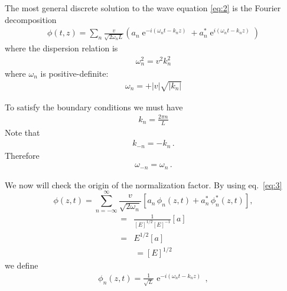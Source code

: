 \begin{frame}
The most general discrete solution to the wave equation  \eqref{eq:2} is the Fourier decomposition
\begin{align}
  \label{eq:3}
  \phi(t,z)=\sum_{n}\frac{v}{\sqrt{2\omega_{n} L}}
  \left(a_{n} \operatorname{e}^{-i (\omega_n t-k_nz) }+a_{n}^* \operatorname{e}^{i (\omega_n t-k_n z) }\right)
\end{align}
where the dispersion relation is
\begin{align}
\label{eq:4}
  \omega_n^2=v^2 k_n^2
\end{align}
where $\omega_n$ is positive-definite:
\begin{align}
  \omega_n=+|v|\sqrt{|k_n|}
\end{align}

To satisfy the boundary conditions we must have
\begin{align}
  \label{eq:5}
  k_n=\frac{2\pi n}{L}
\end{align}
Note that
\begin{align}
  k_{-n}=-k_n\,.
\end{align}
Therefore
\begin{align}
  \omega_{-n}=\omega_n\,.
\end{align}
\end{frame}
\begin{frame}
We now will check the origin of the normalization factor. By using eq.~\eqref{eq:3}
\begin{equation}
\label{eq:6}
   \phi(z,t)=\sum_{n=-\infty}^\infty 
    \frac{v}{\sqrt{2\omega_n}}
  \left[a_n\,\phi_n(z,t)+a_n^*\,\phi_n^*(z,t)\right],
\end{equation}
\begin{align}
  [E]=&\frac{1}{[E]^{1/2}[E]^{-1}}[a]\nonumber\\
  =&E^{1/2}[a]
\end{align}
\begin{align}
  [a]=[E]^{1/2}
\end{align}
we define
\begin{align}
  \phi_n(z,t)=\frac{1}{\sqrt{L}}\operatorname{e}^{-i(\omega_n t-k_n z)}\,,
\end{align}
\end{frame}
